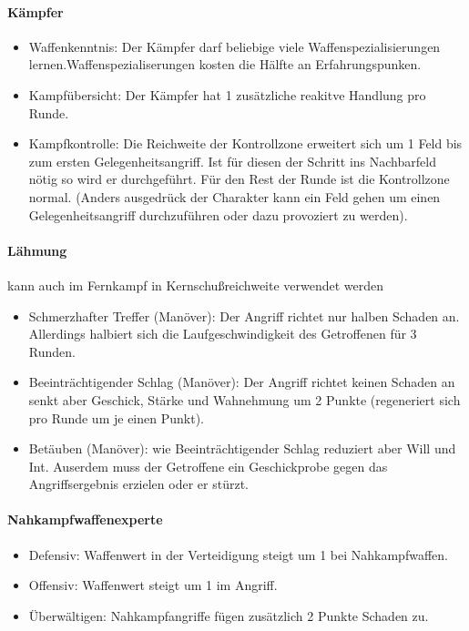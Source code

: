 \documentclass{article}
\begin{document}
\paragraph{Kämpfer}

\begin{itemize}
\item Waffenkenntnis: Der Kämpfer darf beliebige viele Waffenspezialisierungen lernen.Waffenspezialiserungen kosten die Hälfte an Erfahrungspunken.
\item Kampfübersicht: Der Kämpfer hat 1 zusätzliche reakitve Handlung pro Runde.
\item Kampfkontrolle: Die Reichweite der Kontrollzone erweitert sich um 1 Feld bis zum ersten Gelegenheitsangriff. Ist für diesen der Schritt ins Nachbarfeld nötig so wird er durchgeführt. Für den Rest der Runde ist die Kontrollzone normal. (Anders ausgedrück der Charakter kann ein Feld gehen um einen Gelegenheitsangriff durchzuführen oder dazu provoziert zu werden).
\end{itemize}

\paragraph{Lähmung }
kann auch im Fernkampf in Kernschußreichweite verwendet werden

\begin{itemize}
\item Schmerzhafter Treffer (Manöver): Der Angriff richtet nur halben Schaden an. Allerdings halbiert sich die Laufgeschwindigkeit des Getroffenen für 3 Runden.
\item Beeinträchtigender Schlag (Manöver): Der Angriff richtet keinen Schaden an senkt aber Geschick, Stärke und Wahnehmung um 2 Punkte (regeneriert sich pro Runde um je einen Punkt).
\item Betäuben (Manöver): wie Beeinträchtigender Schlag reduziert aber Will und Int. Auserdem muss der Getroffene ein Geschickprobe gegen das Angriffsergebnis erzielen oder er stürzt.
\end{itemize}

\paragraph{Nahkampfwaffenexperte}

\begin{itemize}
\item Defensiv: Waffenwert in der Verteidigung steigt um 1 bei Nahkampfwaffen.
\item Offensiv: Waffenwert steigt um 1 im Angriff.
\item Überwältigen: Nahkampfangriffe fügen zusätzlich 2 Punkte Schaden zu.
\end{itemize}
\end{document}
